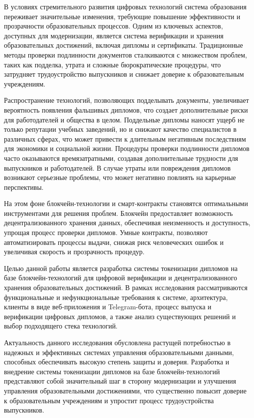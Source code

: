 \label{sec:introduction}

В условиях стремительного развития цифровых технологий система образования переживает значительные изменения, требующие повышение эффективности и прозрачности образовательных процессов. Одним из ключевых аспектов, доступных для модернизации, является система верификации и хранения образовательных достижений, включая дипломы и сертификаты. Традиционные методы проверки подлинности документов сталкиваются с множеством проблем, таких как подделка, утрата и сложные бюрократические процедуры, что затрудняет трудоустройство выпускников и снижает доверие к образовательным учреждениям.

Распространение технологий, позволяющих подделывать документы, увеличивает вероятность появления фальшивых дипломов, что создает дополнительные риски для работодателей и общества в целом. Поддельные дипломы наносят ущерб не только репутации учебных заведений, но и снижают качество специалистов в различных сферах, что может привести к длительным негативным последствиям для экономики и социальной жизни. Процедуры проверки подлинности дипломов часто оказываются времязатратными, создавая дополнительные трудности для выпускников и работодателей. В случае утраты или повреждения дипломов возникают серьезные проблемы, что может негативно повлиять на карьерные перспективы.

На этом фоне блокчейн-технологии и смарт-контракты становятся оптимальными инструментами для решения проблем. Блокчейн предоставляет возможность децентрализованного хранения данных, обеспечивая неизменность и доступность, упрощая процесс проверки дипломов. Умные контракты, позволяют автоматизировать процессы выдачи, снижая риск человеческих ошибок и увеличивая скорость и прозрачность процедур.

Целью данной работы является разработка системы токенизации дипломов на базе блокчейн-технологий для цифровой верификации и децентрализованного хранения образовательных достижений. В рамках исследования рассматриваются функциональные и нефункциональные требования к системе, архитектура, клиенты в виде веб-приложения и Telegram-бота, процесс выпуска и верификации цифровых дипломов, а также анализ существующих решений и выбор подходящего стека технологий.

Актуальность данного исследования обусловлена растущей потребностью в надежных и эффективных системах управления образовательными данными, способных обеспечивать высокую степень защиты и доверия. Разработка и внедрение системы токенизации дипломов на базе блокчейн-технологий представляют собой значительный шаг в сторону модернизации и улучшения управления образовательными достижениями, что существенно повысит доверие к образовательным учреждениям и упростит процесс трудоустройства выпускников.